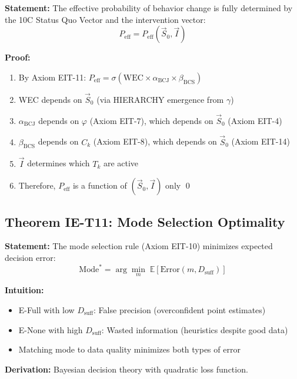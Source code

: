 \begin{tcolorbox}[colback=green!5!white, colframe=green!75!black,
    title=\textbf{Theorem IE-T10: $P_{\text{eff}}$ Emerges from 10C}]

\textbf{Statement:} The effective probability of behavior change is fully determined by the 10C Status Quo Vector and the intervention vector:
\begin{equation}
P_{\text{eff}} = P_{\text{eff}}(\vec{S}_0, \vec{I})
\end{equation}

\textbf{Proof:}
\begin{enumerate}[nosep]
    \item By Axiom EIT-11: $P_{\text{eff}} = \sigma(\text{WEC} \times \alpha_{\text{BCJ}} \times \beta_{\text{BCS}})$
    \item WEC depends on $\vec{S}_0$ (via HIERARCHY emergence from $\gamma$)
    \item $\alpha_{\text{BCJ}}$ depends on $\varphi$ (Axiom EIT-7), which depends on $\vec{S}_0$ (Axiom EIT-4)
    \item $\beta_{\text{BCS}}$ depends on $C_k$ (Axiom EIT-8), which depends on $\vec{S}_0$ (Axiom EIT-14)
    \item $\vec{I}$ determines which $T_k$ are active
    \item Therefore, $P_{\text{eff}}$ is a function of $(\vec{S}_0, \vec{I})$ only \qed
\end{enumerate}

\end{tcolorbox}

\subsection{Theorem IE-T11: Mode Selection Optimality}

\begin{tcolorbox}[colback=green!5!white, colframe=green!75!black,
    title=\textbf{Theorem IE-T11: Mode Selection Minimizes Expected Error}]

\textbf{Statement:} The mode selection rule (Axiom EIT-10) minimizes expected decision error:
\begin{equation}
\text{Mode}^* = \arg\min_m \; \mathbb{E}[\text{Error}(m, D_{\text{suff}})]
\end{equation}

\textbf{Intuition:}
\begin{itemize}[nosep]
    \item E-Full with low $D_{\text{suff}}$: False precision (overconfident point estimates)
    \item E-None with high $D_{\text{suff}}$: Wasted information (heuristics despite good data)
    \item Matching mode to data quality minimizes both types of error
\end{itemize}

\textbf{Derivation:} Bayesian decision theory with quadratic loss function.

\end{tcolorbox}

